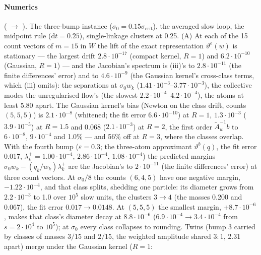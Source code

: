 \begin{sloppypar}
\paragraph{Numerics} ( $\to$ ). The three-bump
instance ($\sigma_0 = 0.15\sigma_{\mathrm{crit}}$), the averaged slow loop, the midpoint rule ($\mathrm{d}t = 0.25$),
single-linkage clusters at 0.25. (A) At each of the 15 count vectors of $m = 15$ in $W$ the lift of the exact
representation $\vartheta^e(w)$ is stationary --- the largest drift $2.8\cdot10^{-17}$ (compact kernel, $R = 1$) and
$6.2\cdot10^{-10}$ (Gaussian, $R = 1$) --- and the Jacobian's spectrum is (iii)'s to $2.8\cdot10^{-11}$ (the finite
differences' error) and to $4.6\cdot10^{-9}$ (the Gaussian kernel's cross-class terms, which (iii) omits): the
separations at $\sigma_0w_k$ ($1.41\cdot10^{-3}$--$3.77\cdot10^{-3}$), the collective modes the unregularised flow's
(the slowest $2.2\cdot10^{-4}$--$4.2\cdot10^{-4}$), the atoms at least 5.80 apart. The Gaussian kernel's bias (Newton
on the class drift, counts $(5,5,5)$) is $2.1\cdot10^{-8}$ (whitened; the fit error $6.6\cdot10^{-10}$) at $R = 1$,
$1.3\cdot10^{-3}$ ($3.9\cdot10^{-5}$) at $R = 1.5$ and 0.068 ($2.1\cdot10^{-3}$) at $R = 2$, the first order
$\tilde A_w^{-1}b$ to $6\cdot10^{-8}$, $9\cdot10^{-4}$ and 1.0\% --- and 56\% off at $R = 3$, where the classes
overlap. With the fourth bump ($\varepsilon = 0.3$; the three-atom approximant $\vartheta^b(q)$, the fit error 0.017,
$\lambda^+_k = 1.00\cdot10^{-4}$, $2.86\cdot10^{-4}$, $1.08\cdot10^{-4}$) the predicted margins
$\sigma_0w_k - (q_k/w_k)\lambda^+_k$ are the Jacobian's to $2\cdot10^{-11}$ (the finite differences' error) at three
count vectors. At $\sigma_0/8$ the counts $(6,4,5)$ have one negative margin, $-1.22\cdot10^{-4}$, and that class
splits, shedding one particle: its diameter grows from $2.2\cdot10^{-3}$ to 1.0 over $10^5$ slow units, the clusters
$3\to4$ (the masses 0.200 and 0.067), the fit error $0.017\to0.0148$. At $(5,5,5)$ the smallest margin,
$+8.7\cdot10^{-6}$, makes that class's diameter decay at $8.8\cdot10^{-6}$ ($6.9\cdot10^{-4}\to3.4\cdot10^{-4}$ from
$s = 2\cdot10^4$ to $10^5$); at $\sigma_0$ every class collapses to rounding. Twins (bump 3 carried by classes of
masses $3/15$ and $2/15$, the weighted amplitude shared $3:1$, 2.31 apart) merge under the Gaussian kernel ($R = 1$:

\end{sloppypar}
